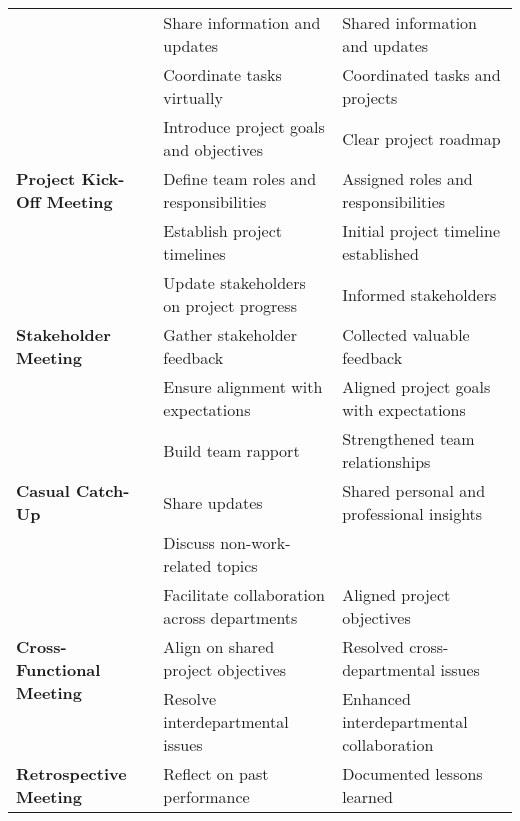 \begin{table*}[ht]
\begin{tabularx}{\textwidth}{m{4cm}XX}
            & Share information and updates & Shared information and updates \\
        
            & Coordinate tasks virtually & Coordinated tasks and projects \\
        \midrule
        \multirow{3}{*}{\textbf{Project Kick-Off Meeting}} 
            & Introduce project goals and objectives & Clear project roadmap \\
        
            & Define team roles and responsibilities & Assigned roles and responsibilities \\
        
            & Establish project timelines & Initial project timeline established \\
        \midrule
        \multirow{3}{*}{\textbf{Stakeholder Meeting}} 
            & Update stakeholders on project progress & Informed stakeholders \\
        
            & Gather stakeholder feedback & Collected valuable feedback \\
        
            & Ensure alignment with expectations & Aligned project goals with expectations \\
        \midrule
        \multirow{3}{*}{\textbf{Casual Catch-Up}} 
            & Build team rapport & Strengthened team relationships \\
        
            & Share updates & Shared personal and professional insights \\
        
            & Discuss non-work-related topics & \\
        \midrule
        \multirow{3}{*}{\textbf{Cross-Functional Meeting}} 
            & Facilitate collaboration across departments & Aligned project objectives \\
        
            & Align on shared project objectives & Resolved cross-departmental issues \\
        
            & Resolve interdepartmental issues & Enhanced interdepartmental collaboration \\
        \midrule
        \multirow{3}{*}{\textbf{Retrospective Meeting}} 
            & Reflect on past performance & Documented lessons learned \\
        

\end{tabularx}
\end{table*}
